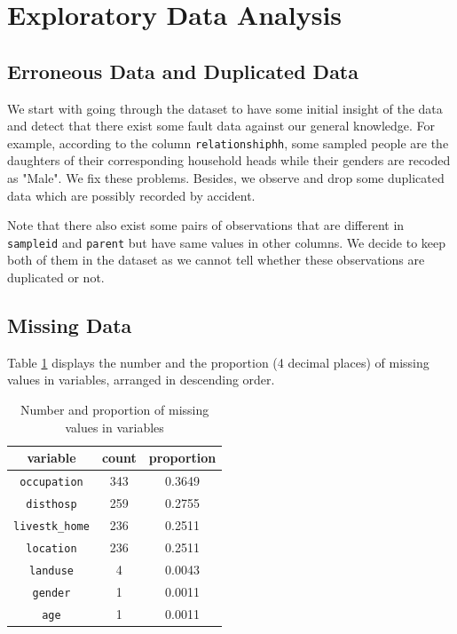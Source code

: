 \documentclass[11pt,twoside]{article}
\numberwithin{Theorem}{section}
\numberwithin{Definition}{section}
\numberwithin{Lemma}{section}
\numberwithin{Algorithm}{section}
\numberwithin{equation}{section}
\begin{document}
\clearpage

\section{Exploratory Data Analysis}  
\label{sec: EDA}

\subsection{Erroneous Data and Duplicated Data}

We start with going through the dataset to have some initial insight of the data and detect that there exist some fault data against our general knowledge. For example, according to the column \texttt{relationshiphh}, some sampled people are the daughters of their corresponding household heads while their genders are recoded as "Male". We fix these problems. Besides, we observe and drop some duplicated data which are possibly recorded by accident. 

Note that there also exist some pairs of observations that are different in \texttt{sampleid} and \texttt{parent} but have same values in other columns. We decide to keep both of them in the dataset as we cannot tell whether these observations are duplicated or not.  

\subsection{Missing Data}

Table \ref{tab:missing} displays the number and the proportion (4 decimal places) of missing values in variables, arranged in descending order. 

\begin{table}[!h]
	\centering
	\begin{tabular}{|c|c|c|}
		\hline
		variable & count & proportion \\
		\hline
		\texttt{occupation} & 343 & 0.3649 \\ 
		\texttt{disthosp} &259 & 0.2755 \\
		\texttt{livestk\_home}  &  236 & 0.2511 \\
        \texttt{location}  &  236 & 0.2511 \\
		\texttt{landuse} & 4 & 0.0043 \\
		\texttt{gender} & 1 & 0.0011 \\
		\texttt{age} & 1 & 0.0011 \\
		\hline
	\end{tabular}
	\caption{Number and proportion of missing values in variables}
	\label{tab:missing}
\end{table}
\end{document}
